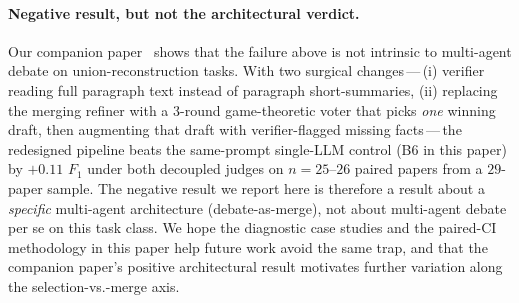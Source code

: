 \documentclass[11pt,a4paper]{article}
\begin{document}
\paragraph{Negative result, but not the architectural verdict.}
Our companion paper~\cite{sun2026onevision} shows that the failure
above is not intrinsic to multi-agent debate on union-reconstruction
tasks. With two surgical changes\,---\,(i) verifier reading full
paragraph text instead of paragraph short-summaries, (ii) replacing
the merging refiner with a 3-round game-theoretic voter that picks
\emph{one} winning draft, then augmenting that draft with
verifier-flagged missing facts\,---\,the redesigned pipeline beats the
same-prompt single-LLM control (B6 in this paper) by $+0.11$ $F_1$
under both decoupled judges on $n=25$--$26$ paired papers from a
$29$-paper sample. The negative
result we report here is therefore a result about a \emph{specific}
multi-agent architecture (debate-as-merge), not about multi-agent
debate per se on this task class. We hope the diagnostic case studies
and the paired-CI methodology in this paper help future work avoid
the same trap, and that the companion paper's positive architectural
result motivates further variation along the
selection-vs.-merge axis.



\end{document}
